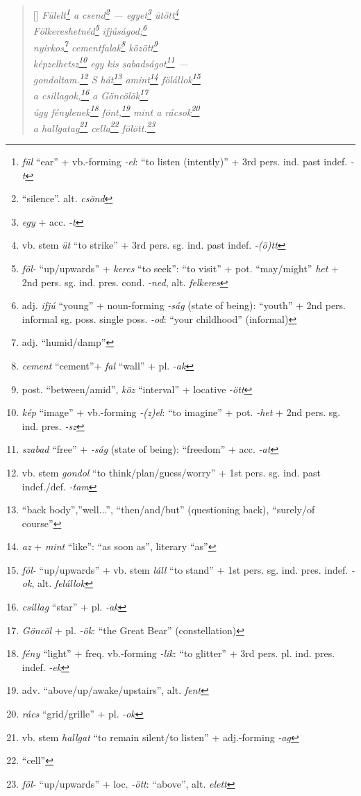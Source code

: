 \documentclass[a4paper,12pt,twoside,final]{book}
\begin{document}
\begin{verse}[\versewidth]
  \it
  Fülelt\footnote{\emph{fül} ``ear'' + vb.-forming \emph{-el}: ``to
  listen (intently)'' + 3rd pers. ind. past indef. \emph{-t}} a
  csend\footnote{``silence''. alt. \emph{csönd}}
  --- egyet\footnote{\emph{egy} + acc. \emph{-t}}
  ütött\footnote{vb. stem \emph{üt} ``to strike'' + 3rd
  pers. sg. ind. past indef. \emph{-(ö)tt}} \\
  Fölkereshetnéd\footnote{\emph{föl-}
  ``up/upwards'' + \emph{keres} ``to seek'': ``to visit'' +
  pot. ``may/might'' \emph{het} + 2nd
  pers. sg. ind. pres. cond. \emph{-ned}, alt. \emph{felkeres}}
  ifjúságod;\footnote{adj. \emph{ifjú} ``young'' + noun-forming
  \emph{-ság} (state of being): ``youth'' + 2nd pers. informal sg.
  poss. single poss. \emph{-od}: ``your childhood'' (informal)} \\
  nyirkos\footnote{adj. ``humid/damp''}
  cementfalak\footnote{\emph{cement} ``cement''+ \emph{fal} ``wall'' +
  pl. \emph{-ak}} között\footnote{post. ``between/amid'', \emph{köz}
  ``interval'' + locative \emph{-ött}} \\
  képzelhetsz\footnote{\emph{kép} ``image'' + vb.-forming
  \emph{-(z)el}: ``to imagine'' + pot. \emph{-het} + 2nd
  pers. sg. ind. pres. \emph{-sz}} egy kis
  sabadságot\footnote{\emph{szabad} ``free'' + \emph{-ság} (state of
  being): ``freedom'' + acc. \emph{-at}} --- \\
  gondoltam.\footnote{vb. stem \emph{gondol} ``to
  think/plan/guess/worry'' + 1st pers. sg. ind. past
  indef./def. \emph{-tam}} S hát\footnote{``back body'',''well...'',
  ``then/and/but'' (questioning back), ``surely/of course''}
  amint\footnote{\emph{az} + \emph{mint} ``like'': ``as soon as'',
  literary ``as''} fölállok\footnote{\emph{föl-}
  ``up/upwards'' +  vb. stem \emph{láll} ``to stand'' + 1st
  pers. sg. ind. pres. indef. \emph{-ok}, alt. \emph{felállok}} \\
  a csillagok,\footnote{\emph{csillag} ``star'' + pl. \emph{-ak}} a
  Göncölök\footnote{\emph{Göncöl} + pl. \emph{-ök}: ``the Great Bear''
  (constellation)} \\
  úgy fénylenek\footnote{\emph{fény} ``light'' + freq. vb.-forming
  \emph{-lik}: ``to glitter'' + 3rd
  pers. pl. ind. pres. indef. \emph{-ek}}
  fönt,\footnote{adv. ``above/up/awake/upstairs'', alt. \emph{fent}}
  mint a rácsok\footnote{\emph{rács} ``grid/grille'' + pl. \emph{-ok}} \\
  a hallgatag\footnote{vb. stem \emph{hallgat} ``to remain silent/to
  listen'' + adj.-forming \emph{-ag}} cella\footnote{``cell''}
  fölött.\footnote{\emph{föl-} ``up/upwards'' +  loc. \emph{-ött}:
  ``above'', alt. \emph{elett}}
\end{verse}
\end{document}
